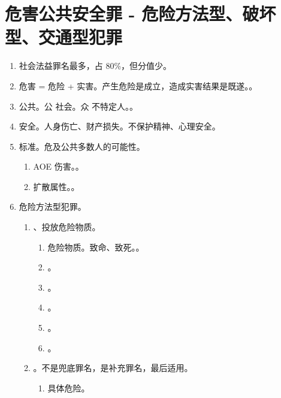 \section{危害公共安全罪 - 危险方法型、破坏型、交通型犯罪}
\begin{enumerate}
  \item 社会法益罪名最多，占 80\%，但分值少。
  \item 危害 = 危险 + 实害。产生危险是成立，造成实害结果是既遂。。
  \item 公共。\yi 公 \yjt 社会。\er 众 \yjt 不特定人。。
  \item 安全。人身伤亡、财产损失。不保护精神、心理安全。
  \item 标准。危及公共多数人的可能性。
        \begin{enumerate}
          \item AOE 伤害。。
          \item 扩散属性。。
        \end{enumerate}
  \item 危险方法型犯罪。
        \begin{enumerate}
          \item {}、投放危险物质。
                \begin{enumerate}
                  \item 危险物质。致命、致死。。
                  \item {}。
                  \item {}。
                  \item {}。
                  \item {}。
                  \item {}。
                \end{enumerate}
          \item {}。不是兜底罪名，是补充罪名，最后适用。
                \begin{enumerate}
                  \item 具体危险。
                        \begin{enumerate}

\end{enumerate}
\end{enumerate}
\end{enumerate}
\end{enumerate}
